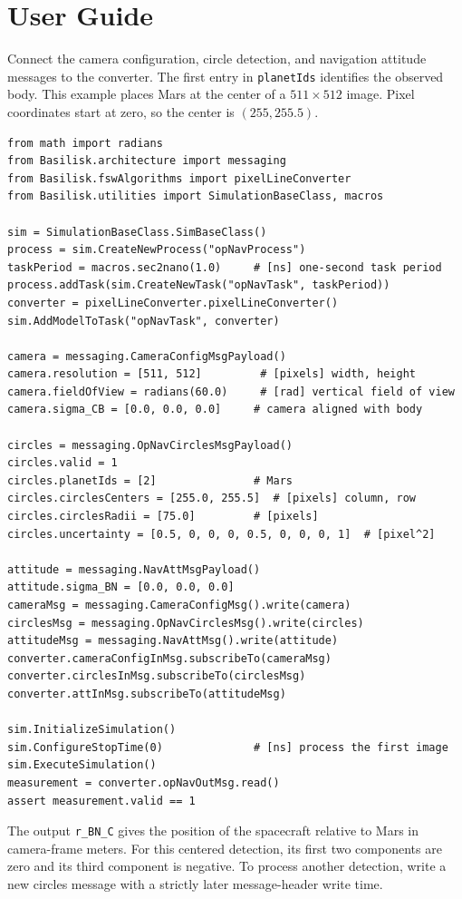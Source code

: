 
\section{User Guide}
Connect the camera configuration, circle detection, and navigation attitude
messages to the converter. The first entry in \texttt{planetIds} identifies
the observed body. This example places Mars at the center of a
$511 \times 512$ image. Pixel coordinates start at zero, so the center is
$(255, 255.5)$.

{\small
\begin{verbatim}
from math import radians
from Basilisk.architecture import messaging
from Basilisk.fswAlgorithms import pixelLineConverter
from Basilisk.utilities import SimulationBaseClass, macros

sim = SimulationBaseClass.SimBaseClass()
process = sim.CreateNewProcess("opNavProcess")
taskPeriod = macros.sec2nano(1.0)     # [ns] one-second task period
process.addTask(sim.CreateNewTask("opNavTask", taskPeriod))
converter = pixelLineConverter.pixelLineConverter()
sim.AddModelToTask("opNavTask", converter)

camera = messaging.CameraConfigMsgPayload()
camera.resolution = [511, 512]         # [pixels] width, height
camera.fieldOfView = radians(60.0)     # [rad] vertical field of view
camera.sigma_CB = [0.0, 0.0, 0.0]     # camera aligned with body

circles = messaging.OpNavCirclesMsgPayload()
circles.valid = 1
circles.planetIds = [2]               # Mars
circles.circlesCenters = [255.0, 255.5]  # [pixels] column, row
circles.circlesRadii = [75.0]         # [pixels]
circles.uncertainty = [0.5, 0, 0, 0, 0.5, 0, 0, 0, 1]  # [pixel^2]

attitude = messaging.NavAttMsgPayload()
attitude.sigma_BN = [0.0, 0.0, 0.0]
cameraMsg = messaging.CameraConfigMsg().write(camera)
circlesMsg = messaging.OpNavCirclesMsg().write(circles)
attitudeMsg = messaging.NavAttMsg().write(attitude)
converter.cameraConfigInMsg.subscribeTo(cameraMsg)
converter.circlesInMsg.subscribeTo(circlesMsg)
converter.attInMsg.subscribeTo(attitudeMsg)

sim.InitializeSimulation()
sim.ConfigureStopTime(0)              # [ns] process the first image
sim.ExecuteSimulation()
measurement = converter.opNavOutMsg.read()
assert measurement.valid == 1
\end{verbatim}
}

The output \texttt{r\_BN\_C} gives the position of the spacecraft relative
to Mars in camera-frame meters. For this centered detection, its first two
components are zero and its third component is negative. To process another
detection, write a new circles message with a strictly later message-header
write time.
